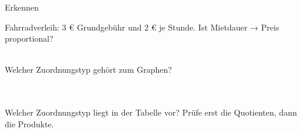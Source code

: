 \begin{aufgabe}{Erkennen}
\begin{teile}
\teil Fahrradverleih: 3 € Grundgebühr und 2 € je Stunde. Ist Mietdauer → Preis proportional? \\  \\ 
\end{teile}
\begin{teile}
\teil Welcher Zuordnungstyp gehört zum Graphen? \\  \\  \\ 
\end{teile}
\begin{teile}
\teil Welcher Zuordnungstyp liegt in der Tabelle vor? Prüfe erst die Quotienten, dann die Produkte. \\  \\  \\ 
\end{teile}
\end{aufgabe}

